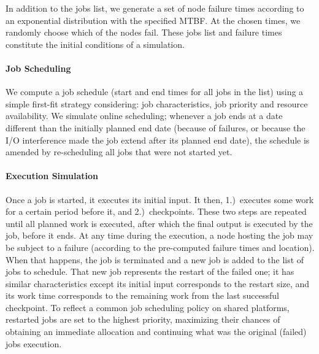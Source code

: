 \documentclass[two]{article}
\begin{document}
In addition to the jobs list, we generate a set of node failure times according to an
exponential distribution with the specified MTBF. At the chosen times, we randomly
choose which of the nodes fail.  These jobs list and failure times constitute
the initial conditions of a simulation.

\paragraph*{Job Scheduling}

We compute a job schedule (start and end times for all jobs in the list) using
a simple first-fit strategy considering: job characteristics, job priority and
resource availability.  We simulate online scheduling; whenever a job
ends at a date different than the initially planned end date (because of
failures, or because the I/O interference made the job extend after
its planned end date), the schedule is amended by re-scheduling all
jobs that were not started yet.

\paragraph*{Execution Simulation}

Once a job is started, it executes its initial input. It then, 1.)~executes
some work for a certain period before it, and 2.)~checkpoints. These two steps
are repeated until all planned work is executed, after which the final output
is executed by the job, before it ends.  At any time during the execution, a
node hosting the job may be subject to a failure (according to the pre-computed
failure times and location). When that happens, the job is terminated and a new
job is added to the list of jobs to schedule. That new job represents the
restart of the failed one; it has similar characteristics except its initial
input corresponds to the restart size, and its work time corresponds to the
remaining work from the last successful checkpoint. To reflect a common job
scheduling policy on shared platforms, restarted jobs are set to the highest
priority, maximizing their chances of obtaining an immediate allocation and
continuing what was the original (failed) jobs execution.
\end{document}
